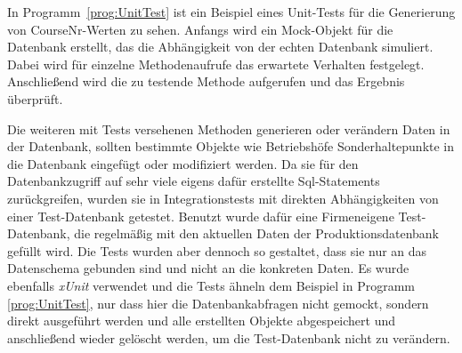     In Programm~\ref{prog:UnitTest} ist ein Beispiel eines Unit-Tests für die Generierung von CourseNr-Werten zu sehen. 
    Anfangs wird ein Mock-Objekt für die Datenbank erstellt, das die Abhängigkeit von der echten Datenbank simuliert. Dabei wird für 
    einzelne Methodenaufrufe das erwartete Verhalten festgelegt. Anschließend wird die zu testende Methode aufgerufen und das Ergebnis überprüft.

    Die weiteren mit Tests versehenen Methoden generieren oder verändern Daten in der Datenbank, sollten bestimmte Objekte wie Betriebshöfe Sonderhaltepunkte in die
    Datenbank eingefügt oder modifiziert werden. Da sie für den Datenbankzugriff auf sehr viele eigens dafür erstellte Sql-Statements zurückgreifen, wurden sie in Integrationstests 
    mit direkten Abhängigkeiten von einer Test-Datenbank getestet. Benutzt wurde dafür eine Firmeneigene Test-Datenbank, die regelmäßig mit den aktuellen Daten der Produktionsdatenbank gefüllt wird.
    Die Tests wurden aber dennoch so gestaltet, dass sie nur an das Datenschema gebunden sind und nicht an die konkreten Daten.
    Es wurde ebenfalls \emph{xUnit} verwendet und die Tests ähneln dem Beispiel in Programm \ref{prog:UnitTest}, nur dass hier die Datenbankabfragen nicht gemockt, sondern 
    direkt ausgeführt werden und alle erstellten Objekte abgespeichert und anschließend wieder gelöscht werden, um die Test-Datenbank nicht zu verändern.